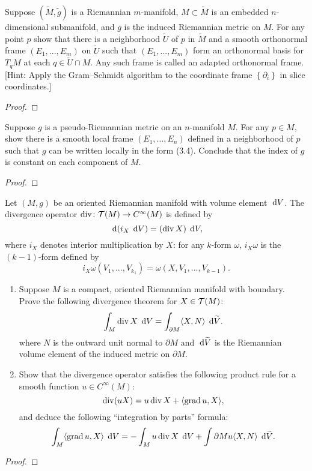 \begin{problem}
Suppose $(\widetilde M,\tilde g)$ is a Riemannian $m$-manifold,
$M\subset\widetilde M$ is an embedded $n$-dimensional submanifold, and $g$
is the induced Riemannian metric on $M$. For any point $p$ show that there
is a neighborhood $\widetilde U$ of $p$ in $\widetilde M$ and a smooth
orthonormal frame $(E_1,...,E_m)$ on $\widetilde U$ such that
$(E_1,...,E_m)$ form an orthonormal basis for $T_qM$ at each
$q\in\widetilde{U}\cap M$. Any such frame is called an adapted orthonormal
frame. [Hint: Apply the Gram--Schmidt algorithm to the coordinate frame
$\left\{\partial_i\right\}$ in slice coordinates.]
\end{problem}
\begin{proof}
\end{proof}
\newpage

\begin{problem}
Suppose $g$ is a pseudo-Riemannian metric on an $n$-manifold $M$. For any
$p\in M$, show there is a smooth local frame $(E_1,...,E_n)$ defined in a
neighborhood of $p$ such that $g$ can be written locally in the form
(3.4). Conclude that the index of $g$ is constant on each component of
$M$.
\end{problem}
\begin{proof}
\end{proof}
\newpage

\begin{problem}
Let $(M,g)$ be an oriented Riemannian manifold with volume element
$\;\mathrm{d} V$. The divergence operator $\operatorname{div}\colon\mathcal{T}(M)\to C^\infty(M)$ is
defined by
\[
\;\mathrm{d}(i_X\,\;\mathrm{d} V)=(\operatorname{div} X)\,\;\mathrm{d} V,
\]
where $i_X$ denotes interior multiplication by $X$: for any $k$-form
$\omega$, $i_X\omega$ is the $(k-1)$-form defined by
\[
i_X\omega(V_1,...,V_{k_1})=\omega(X,V_1,...,V_{k-1}).
\]
\begin{enumerate}[label=(\alph*)]
\item Suppose $M$ is a compact, oriented Riemannian manifold with
  boundary. Prove the following divergence theorem for $X\in\mathcal{T}(M)$:
\[
\int_M\operatorname{div} X\,\;\mathrm{d} V=\int_{\partial M}\langle X,N \rangle\,\;\mathrm{d}\widetilde V.
\]
where $N$ is the outward unit normal to $\partial M$ and $\;\mathrm{d}\widetilde V$ is
the Riemannian volume element of the induced metric on $\partial M$.
\item Show that the divergence operator satisfies the following product
  rule for a smooth function $u\in C^\infty(M)$:
\[
\operatorname{div}(uX)=u\operatorname{div} X+\langle\operatorname{grad} u,X\rangle,
\]
and deduce the following ``integration by parts'' formula:
\[
\int_M\langle\operatorname{grad} u,X\rangle\,\;\mathrm{d} V=-\int_M u\operatorname{div} X\,\;\mathrm{d} V+\int{\partial M}
u\langle X,N\rangle\,\;\mathrm{d}\widetilde V.
\]
\end{enumerate}
\end{problem}
\begin{proof}
\end{proof}
\newpage

